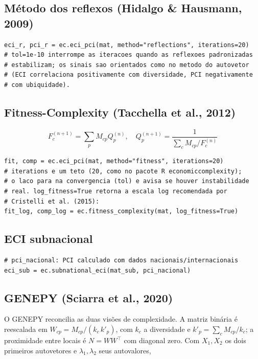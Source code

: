 \documentclass[12pt, a4paper]{article}
\begin{document}
\subsection{M\'{e}todo dos reflexos (Hidalgo \& Hausmann, 2009)}

\begin{lstlisting}[caption={M\'{e}todo de Reflex\~{o}es}]
eci_r, pci_r = ec.eci_pci(mat, method="reflections", iterations=20)
# tol=1e-10 interrompe as iteracoes quando as reflexoes padronizadas
# estabilizam; os sinais sao orientados como no metodo do autovetor
# (ECI correlaciona positivamente com diversidade, PCI negativamente
# com ubiquidade).
\end{lstlisting}

\subsection{Fitness-Complexity (Tacchella et al., 2012)}

\[
  F_c^{(n+1)} = \sum_p M_{cp} Q_p^{(n)}, \quad
  Q_p^{(n+1)} = \frac{1}{\sum_c M_{cp} / F_c^{(n)}}
\]

\begin{lstlisting}[caption={Fitness-Complexity}]
fit, comp = ec.eci_pci(mat, method="fitness", iterations=20)
# iterations e um teto (20, como no pacote R economiccomplexity);
# o laco para na convergencia (tol) e avisa se houver instabilidade
# real. log_fitness=True retorna a escala log recomendada por
# Cristelli et al. (2015):
fit_log, comp_log = ec.fitness_complexity(mat, log_fitness=True)
\end{lstlisting}

\subsection{ECI subnacional}

\begin{lstlisting}[caption={ECI subnacional com PCI externo}]
# pci_nacional: PCI calculado com dados nacionais/internacionais
eci_sub = ec.subnational_eci(mat_sub, pci_nacional)
\end{lstlisting}

\subsection{GENEPY (Sciarra et al., 2020)}

\begin{sloppypar}
O GENEPY reconcilia as duas vis\~{o}es de complexidade. A matriz
bin\'{a}ria \'{e} reescalada em $W_{cp} = M_{cp} / (k_c\,k'_p)$, com $k_c$ a
diversidade e $k'_p = \sum_c M_{cp}/k_c$; a proximidade entre locais \'{e}
$N = WW^{\top}$ com diagonal zero. Com $X_1, X_2$ os dois primeiros
autovetores e $\lambda_1, \lambda_2$ seus autovalores,
\end{sloppypar}
\end{document}
